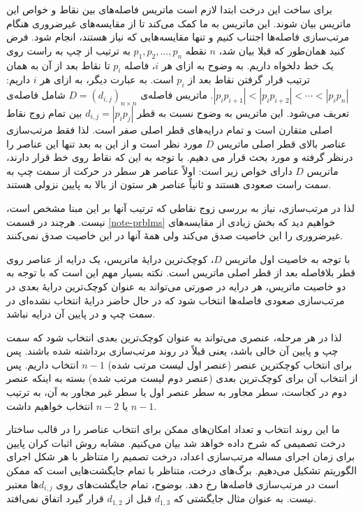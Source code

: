 \documentclass[a0,portrait]{a0poster}
\theoremstyle{definition}
\theoremstyle{plain}
\theoremstyle{definition}
\begin{document}
\begin{multicols}{2}
 برای ساخت این درخت ابتدا لازم است ماتریس فاصله‌های بین نقاط و 
 خواص این ماتریس بیان شوند. این ماتریس به ما کمک می‌کند تا از مقایسه‌های 
 غیرضروری هنگام مرتب‌سازی  فاصله‌ها اجتناب کنیم و تنها مقایسه‌هایی که نیاز 
 هستند، انجام شود. فرض کنید همان‌طور که قبلا بیان شد، $n$ نقطه 
 $p_1,p_2,\ldots,p_n$ به ترتیب از چپ به راست روی یک خط دلخواه داریم.
 به وضوح به ازای هر $i$، فاصله $p_i$ تا نقاط بعد از آن به همان ترتیب
 قرار گرفتن نقاط بعد از $p_i$ است. به عبارت دیگر، به ازای هر $i$ داریم:
 $|p_ip_{i+1}|< |p_ip_{i+2}|<\cdots <|p_ip_n|$.
ماتریس فاصله‌ی $D=(d_{i,j})_{n\times n}$ شامل
 فاصله‌ی بین تمام زوج نقاط ‎$d_{i,j}=|p_{i}p_{j}|$
تعریف می‌شود.
‏این ماتریس به وضوح نسبت به قطر اصلی متقارن است و تمام
درایه‌های قطر اصلی صفر است. 
لذا فقط مرتب‌سازی عناصر بالای قطر اصلی ماتریس $D$ مورد نظر است و 
از این به بعد تنها این عناصر را درنظر گرفته و مورد بحث قرار می دهیم. 
با توجه به این که نقاط روی خط قرار دارند، ماتریس $D$  دارای خواص زیر است:
اولاً عناصر هر سطر در حرکت از سمت چپ به سمت راست صعودی هستند و ثانیاً عناصر هر ستون از بالا به پایین نزولی هستند.

 لذا در مرتب‌سازی، نیاز به بررسی زوج نقاطی که 
 ترتیب آنها بر این مبنا مشخص است، نیست. هرچند 
 در قسمت \ref{note-prblms} خواهیم دید که بخش زیادی از مقایسه‌های 
 غیرضروری را این خاصیت صدق می‌کند ولی همۀ آنها در این خاصیت
 صدق نمی‌کنند. 

با توجه به خاصیت اول ماتریس $D$،
کوچک‌ترین درایۀ  ماتریس،  یک درایه از عناصر روی قطر بلافاصله بعد از قطر اصلی ماتریس است.
 نکته بسیار مهم این است که با توجه به دو خاصیت ماتریس، هر درایه
 در صورتی می‌تواند به عنوان کوچک‌‌ترین درایۀ  بعدی در مرتب‌سازی صعودی 
 فاصله‌ها ‌انتخاب شود که در حال حاضر درایۀ انتخاب نشده‌ای 
  در سمت چپ و در پایین آن درایه نباشد.
  
 لذا در هر مرحله، عنصری می‌تواند به عنوان کوچک‌ترین بعدی انتخاب شود که
 سمت چپ و پایین آن خالی باشد، یعنی قبلاً در روند مرتب‌سازی برداشته شده باشند.
پس برای انتخاب کوچکترین عنصر (عنصر اول لیست مرتب شده) 
$n-1$ انتخاب داریم. پس از انتخاب آن برای کوچک‌ترین بعدی 
(عنصر دوم لیست مرتب شده) بسته به اینکه عنصر دوم در کجاست، 
سطر مجاور به سطر عنصر اول یا سطر غیر مجاور به آن،
 به ترتیب $n-1$ یا $n-2$ انتخاب خواهیم داشت.

ما این روند انتخاب و تعداد امکان‌های ممکن برای انتخاب عناصر را در قالب
 ساختار درخت تصمیمی که شرح داده خواهد شد بیان می‌کنیم. 
 مشابه روش اثبات کران پایین برای زمان اجرای مساله مرتب‌سازی اعداد، 
 درخت تصمیم را متناظر با هر شکل اجرای الگوریتم تشکیل می‌دهیم. 
 برگ‌های درخت، متناظر با تمام جایگشت‌هایی است که ممکن است در
 مرتب‌سازی فاصله‌ها رخ دهد.
بوضوح، تمام جایگشت‌های روی $d_{i,j}$ها معتبر نیست.
 به عنوان مثال جایگشتی که $d_{1,3}$ قبل از
$d_{1,2}$ قرار گیرد اتفاق نمی‌افتد.
 

\end{multicols}
\end{document}
